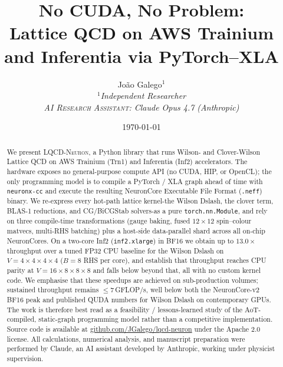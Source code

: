 \documentclass[a4paper,11pt]{article}
\newcommand{\NEFF}{\texttt{.neff}}
\begin{document}

\newcommand{\authorblock}{%
\author{Jo\~ao Galego$^{1}$\\[0.5em]
\small\itshape $^1$Independent Researcher\\[1.2em]
\normalsize\textsc{AI Research Assistant}: Claude Opus 4.7 (Anthropic)}
}


\title{No CUDA, No Problem:\\[0.3em]
       Lattice QCD on AWS Trainium and Inferentia via PyTorch--XLA}

\authorblock

\date{\today}

\maketitle

\begin{abstract}
\noindent
We present \textsc{LQCD-Neuron}, a Python library that runs Wilson- and
Clover-Wilson Lattice QCD on AWS Trainium (Trn1) and Inferentia (Inf2)
accelerators. The hardware exposes no general-purpose compute API
(no CUDA, HIP, or OpenCL); the only programming model is to compile a
PyTorch / XLA graph ahead of time with \texttt{neuronx-cc} and execute
the resulting NeuronCore Executable File Format (\NEFF) binary. We
re-express every hot-path lattice kernel-the Wilson Dslash, the
clover term, BLAS-1 reductions, and CG/BiCGStab solvers-as a pure
\texttt{torch.nn.Module}, and rely on three compile-time
transformations (gauge baking, fused $12{\times}12$ spin--colour
matvecs, multi-RHS batching) plus a host-side data-parallel shard
across all on-chip NeuronCores. On a two-core Inf2 (\texttt{inf2.xlarge})
in BF16 we obtain up to $13.0\times$ throughput over a tuned FP32 CPU
baseline for the Wilson Dslash on $V=4{\times}4{\times}4{\times}4$ ($B{=}8$
RHS per core), and establish that throughput reaches CPU parity at
$V=16{\times}8{\times}8{\times}8$ and falls below beyond that, all with no
custom kernel code. We emphasise that these speedups are achieved on
sub-production volumes; sustained throughput remains $\le 7$\,GFLOP/s,
well below both the NeuronCore-v2 BF16 peak and published QUDA
numbers for Wilson Dslash on contemporary GPUs. The work is therefore
best read as a feasibility / lessons-learned study of the AoT-compiled,
static-graph programming model rather than a competitive
implementation. Source code is available at
\href{https://github.com/JGalego/lqcd-neuron}{github.com/JGalego/lqcd-neuron}
under the Apache 2.0 license. All calculations, numerical analysis, and
manuscript preparation were performed by Claude, an AI assistant developed
by Anthropic, working under physicist supervision.
\end{abstract}
\end{document}
